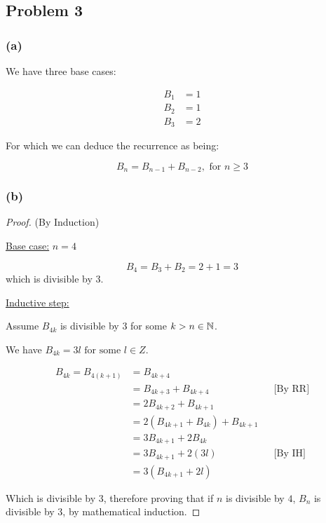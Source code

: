 \documentclass[10pt]{article}
\begin{document}
\newpage
\subsection*{Problem 3}

\subsubsection*{(a)}

We have three base cases:

\begin{align*}
  B_{1} &= 1 \\
  B_{2} &= 1 \\
  B_{3} &= 2
\end{align*}

\noindent
For which we can deduce the recurrence as being:

$$B_{n} = B_{n - 1} + B_{n - 2}, \text{ for }n \ge 3$$

\subsubsection*{(b)}

\begin{proof}
  (By Induction)
  \spacing

  \noindent
  \underline{Base case:} $n = 4$
  \spacing

  \noindent
  $$B_{4} = B_{3} + B_{2} = 2 + 1 = 3$$
  which is divisible by 3.
  \spacing

  \noindent
  \underline{Inductive step:}
  \spacing

  \noindent
  Assume $B_{4k}$ is divisible by 3 for some $k > n \in \mathbb{N}$.
  \spacing

  \noindent
  We have $B_{4k} = 3l \text{ for some } l \in Z$.

  \begin{align*}
    B_{4k} = B_{4(k + 1)} &= B_{4k + 4} \\
      &= B_{4k + 3} + B_{4k + 4} && \text{[By RR]} \\
      &= 2B_{4k + 2} + B_{4k + 1} \\
      &= 2(B_{4k + 1} + B_{4k}) + B_{4k + 1} \\
      &= 3B_{4k + 1} + 2B_{4k} \\
      &= 3B_{4k + 1} + 2(3l) && \text{[By IH]} \\
      &= 3(B_{4k + 1} + 2l)
  \end{align*}
  
  \noindent
  Which is divisible by 3, therefore proving that if $n$ is divisible by $4$, $B_{n}$ is divisible by 3,
  by mathematical induction.
\end{proof}
\end{document}
